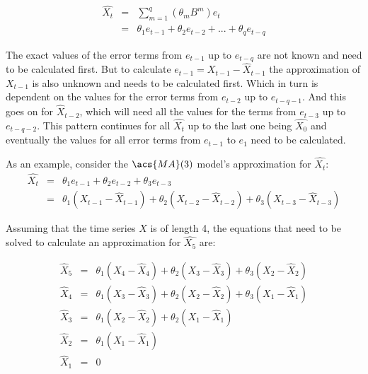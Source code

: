 \begin{equation}\label{eq:MA_hat_q}
    \begin{array}{lcl}
        \hat{X_t} &=& \displaystyle\sum_{m=1}^{q} (\theta_m B^m) e_t \\
        &=& \theta_1 e_{t-1}+ \theta_2 e_{t-2}+ ... + \theta_q e_{t-q}
    \end{array}
\end{equation}

The exact values of the error terms from $e_{t-1}$ up to $e_{t-q}$ are not known and need to be calculated first. But to calculate $e_{t-1}= X_{t-1} - \hat{X}_{t-1}$ the approximation of $X_{t-1}$ is also unknown and needs to be calculated first. Which in turn is dependent on the values for the error terms from $e_{t-2}$ up to $e_{t-q-1}$. And this goes on for $\hat{X}_{t-2}$, which will need all the values for the terms  from $e_{t-3}$ up to $e_{t-q-2}$. This pattern continues for all $\hat{X_{t}}$ up to the last one being $\hat{X_0}$ and eventually the values for all error terms from $e_{t-1}$ to $e_{1}$ need to be calculated.

As an example, consider the $\acs{MA}(3)$ model's approximation for $\hat{X_t}$:
\begin{equation}\label{eq:MA_hat_3}
    \begin{array}{lcl}
        \hat{X_t} &=& \theta_1 e_{t-1}+ \theta_2 e_{t-2} + \theta_3 e_{t-3} \\
        &=& \theta_1 (X_{t-1} - {\hat{X}}_{t-1}) + \theta_2 (X_{t-2} - {\hat{X}}_{t-2}) + \theta_3 (X_{t-3} - {\hat{X}}_{t-3})
    \end{array}
\end{equation}

Assuming that the time series $X$ is of length 4, the equations that need to be solved to calculate an approximation for $\hat{X_5}$ are:

\begin{equation}\label{eq:MA_hat_3_system_1}
    \begin{array}{lcl}
        {\hat{X}}_{5} & = & \theta_1 (X_{4} - {\hat{X}}_{4}) + \theta_2 (X_{3} - {\hat{X}}_{3}) + \theta_3 (X_{2} - {\hat{X}}_{2}) \\
        {\hat{X}}_{4} & = & \theta_1 (X_{3} - {\hat{X}}_{3}) + \theta_2 (X_{2} - {\hat{X}}_{2}) + \theta_3 (X_{1} - {\hat{X}}_{1}) \\
        {\hat{X}}_{3} & = & \theta_1 (X_{2} - {\hat{X}}_{2}) + \theta_2 (X_{1} - {\hat{X}}_{1})\\
        {\hat{X}}_{2} & = & \theta_1 (X_{1} - {\hat{X}}_{1})\\
        {\hat{X}}_{1} & = & 0
    \end{array}
\end{equation}

